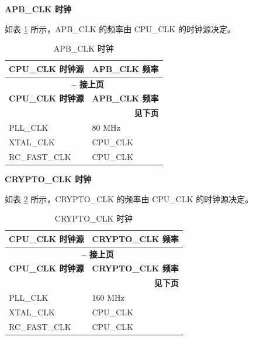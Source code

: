 \documentclass[main\_\_CN.tex]{subfiles}
\begin{document}
\textbf{APB\_CLK 时钟}

如表 \ref{tab:resclk-apb-clk-freq} 所示，APB\_CLK 的频率由 CPU\_CLK 的时钟源决定。

 \begin{longtable}[c]{ |p{5cm}|p{5cm}| }
      \caption{APB\_CLK 时钟}
    \label{tab:resclk-apb-clk-freq} \\
        \hline
        \rowcolor{lightgray}
            \textbf{CPU\_CLK 时钟源} & \textbf{APB\_CLK 频率} \\\hline
        \endfirsthead

        \multicolumn{2}{c}{\bfseries \tablename\ \thetable{} -- 接上页}\\\hline
        \rowcolor{lightgray}
        \textbf{CPU\_CLK 时钟源} & \textbf{APB\_CLK 频率} \\\hline
        \endhead
        \multicolumn{2}{r}{\textbf{见下页}} \\
        \endfoot
        \endlastfoot
        \hline
        PLL\_CLK & 80 MHz \\
        \hline
        XTAL\_CLK & CPU\_CLK \\
        \hline
        RC\_FAST\_CLK & CPU\_CLK \\
        \hline
\end{longtable}


\textbf{CRYPTO\_CLK 时钟}

如表 \ref{tab:resclk-crypto-clk-freq} 所示，CRYPTO\_CLK 的频率由 CPU\_CLK 的时钟源决定。

 \begin{longtable}[c]{ |p{5cm}|p{5cm}| }
      \caption{CRYPTO\_CLK 时钟}
    \label{tab:resclk-crypto-clk-freq} \\
        \hline
    \rowcolor{lightgray}
        \textbf{CPU\_CLK 时钟源} & \textbf{CRYPTO\_CLK 频率} \\
        \hline
        \endfirsthead
        \multicolumn{2}{c}{\bfseries \tablename\ \thetable{} -- 接上页}\\\hline

    \rowcolor{lightgray}
        \textbf{CPU\_CLK 时钟源} & \textbf{CRYPTO\_CLK 频率} \\\hline
        \endhead
        \multicolumn{2}{r}{\textbf{见下页}} \\
        \endfoot
        \endlastfoot
        \hline
        PLL\_CLK & 160 MHz \\
        \hline
        XTAL\_CLK & CPU\_CLK \\
        \hline
        RC\_FAST\_CLK & CPU\_CLK \\
        \hline
\end{longtable}
\end{document}
